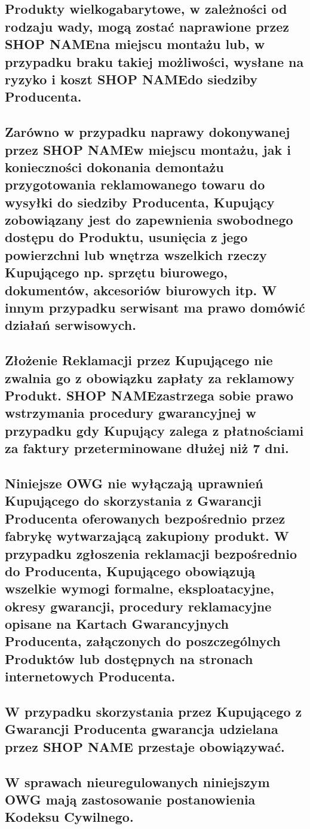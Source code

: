 \documentclass[10pt,a4paper]{article}
\newcommand{\shopname}{SHOP NAME}
\begin{document}
\subsection{Produkty wielkogabarytowe, w zależności od rodzaju wady, mogą zostać naprawione przez \shopname na miejscu montażu lub, w
przypadku braku takiej możliwości, wysłane na ryzyko i koszt \shopname do siedziby Producenta.}

\subsection{Zarówno w przypadku naprawy dokonywanej przez \shopname w miejscu montażu, jak i konieczności dokonania demontażu przygotowania reklamowanego towaru do wysyłki do siedziby Producenta, Kupujący zobowiązany jest do zapewnienia swobodnego
dostępu do Produktu, usunięcia z jego powierzchni lub wnętrza wszelkich rzeczy Kupującego np. sprzętu biurowego, dokumentów,
akcesoriów biurowych itp. W innym przypadku serwisant ma prawo domówić działań serwisowych.}

\subsection{Złożenie Reklamacji przez Kupującego nie zwalnia go z obowiązku zapłaty za reklamowy Produkt. \shopname zastrzega sobie prawo
wstrzymania procedury gwarancyjnej w przypadku gdy Kupujący zalega z płatnościami za faktury przeterminowane dłużej niż 7 dni.}

\subsection{Niniejsze OWG nie wyłączają uprawnień Kupującego do skorzystania z Gwarancji Producenta oferowanych bezpośrednio przez
fabrykę wytwarzającą zakupiony produkt. W przypadku zgłoszenia reklamacji bezpośrednio do Producenta, Kupującego obowiązują
wszelkie wymogi formalne, eksploatacyjne, okresy gwarancji, procedury reklamacyjne opisane na Kartach Gwarancyjnych
Producenta, załączonych do poszczególnych Produktów lub dostępnych na stronach internetowych Producenta.}

\subsection{W przypadku skorzystania przez Kupującego z Gwarancji Producenta gwarancja udzielana przez \shopname 
przestaje obowiązywać.}

\subsection{W sprawach nieuregulowanych niniejszym OWG mają zastosowanie postanowienia Kodeksu Cywilnego.}
\end{document}

